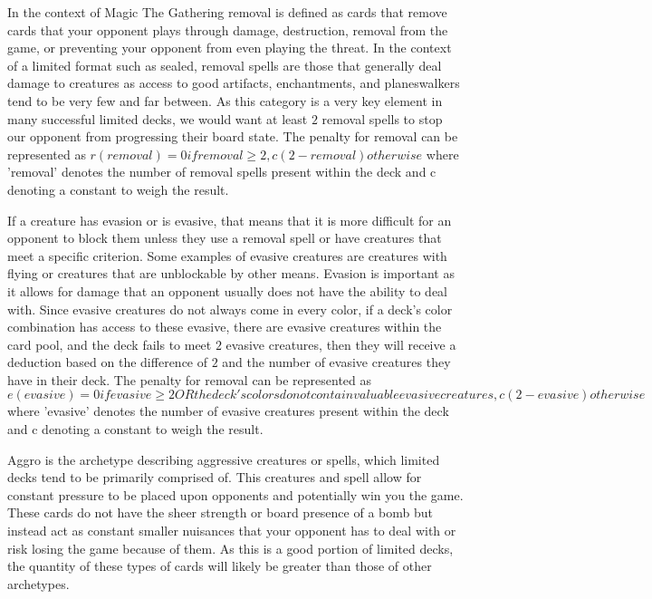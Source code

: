 \documentclass[12pt, letterpaper]{article}
\begin{document}
    In the context of Magic The Gathering removal is defined as cards that remove cards that your opponent plays through
damage, destruction, removal from the game, or preventing your opponent from even playing the threat. In the context of
a limited format such as sealed, removal spells are those that generally deal damage to creatures as access to good
artifacts, enchantments, and planeswalkers tend to be very few and far between. As this category is a very key element in
many successful limited decks, we would want at least $2$ removal spells to stop our opponent from progressing their board
state. The penalty for removal can be represented as $r(removal) = 0 if removal \ge 2, c(2-removal) otherwise$ where
'removal' denotes the number of removal spells present within the deck and c denoting a constant to weigh the result.

    If a creature has evasion or is evasive, that means that it is more difficult for an opponent to block them unless they
use a removal spell or have creatures that meet a specific criterion. Some examples of evasive creatures are creatures
with flying or creatures that are unblockable by other means. Evasion is important as it allows for damage that an
opponent usually does not have the ability to deal with. Since evasive creatures do not always come in every color, if a
deck’s color combination has access to these evasive, there are evasive creatures within the card pool, and the deck fails
to meet $2$ evasive creatures, then they will receive a deduction based on the difference of $2$ and the number of evasive
creatures they have in their deck. The penalty for removal can be represented as $e(evasive) = 0 if evasive \ge 2 OR the
deck's colors do not contain valuable evasive creatures, c(2-evasive) otherwise$ where 'evasive' denotes the number of
evasive creatures present within the deck and c denoting a constant to weigh the result.

    Aggro is the archetype describing aggressive creatures or spells, which limited decks tend to be primarily comprised of.
This creatures and spell allow for constant pressure to be placed upon opponents and potentially win you the game. These
cards do not have the sheer strength or board presence of a bomb but instead act as constant smaller nuisances that your
opponent has to deal with or risk losing the game because of them. As this is a good portion of limited decks, the
quantity of these types of cards will likely be greater than those of other archetypes.
\end{document}
